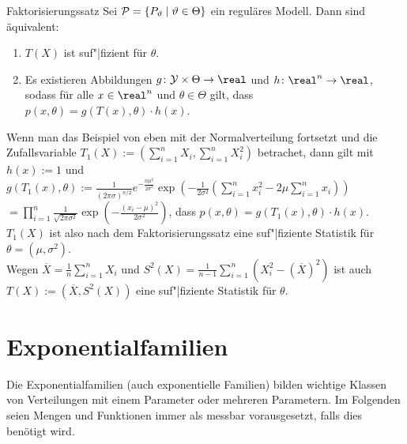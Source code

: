 \begin{Satz}{Faktorisierungssatz}
    Sei $\P = \{P_\theta \;|\; \theta \in \Theta\}$ ein reguläres Modell.
    Dann sind äquivalent:
    \begin{enumerate}
        \item
        $T(X)$ ist suf"|fizient für $\theta$.

        \item
        Es existieren Abbildungen $g\colon \Y \times \Theta \rightarrow \real$
        und $h\colon \real^n \rightarrow \real$, sodass
        für alle $x \in \real^n$ und $\theta \in \Theta$ gilt, dass
        $p(x, \theta) = g(T(x), \theta) \cdot h(x)$.
    \end{enumerate}
\end{Satz}

\linie

\begin{Bsp}
    Wenn man das Beispiel von eben mit der Normalverteilung fortsetzt und die Zufallsvariable
    $T_1(X) := (\sum_{i=1}^n X_i, \sum_{i=1}^n X_i^2)$ betrachet,
    dann gilt mit $h(x) := 1$ und\\
    $g(T_1(x), \theta) := \frac{1}{(2\pi\sigma)^{n/2}} e^{-\frac{n\mu^2}{2\sigma^2}}
    \exp\!\left(-\frac{1}{2\sigma^2}
    \left(\sum_{i=1}^n x_i^2 - 2\mu \sum_{i=1}^n x_i\right)\right)$\\
    $= \prod_{i=1}^n \frac{1}{\sqrt{2\pi\sigma^2}}
    \exp\!\left(-\frac{(x_i - \mu)^2}{2\sigma^2}\right)$, dass
    $p(x, \theta) = g(T_1(x), \theta) \cdot h(x)$.\\
    $T_1(X)$ ist also nach dem Faktorisierungssatz eine suf"|fiziente Statistik für
    $\theta = (\mu, \sigma^2)$.\\
    Wegen $\overline{X} = \frac{1}{n} \sum_{i=1}^n X_i$ und
    $S^2(X) = \frac{1}{n-1} \sum_{i=1}^n (X_i^2 - (\overline{X})^2)$ ist auch
    $T(X) := (\overline{X}, S^2(X))$ eine suf"|fiziente Statistik für $\theta$.
\end{Bsp}

\section{%
    Exponentialfamilien%
}

\begin{Bem}
    Die Exponentialfamilien (auch exponentielle Familien) bilden wichtige Klassen von Verteilungen
    mit einem Parameter oder mehreren Parametern.
    Im Folgenden seien Mengen und Funktionen immer als messbar vorausgesetzt, falls dies
    benötigt wird.
\end{Bem}

